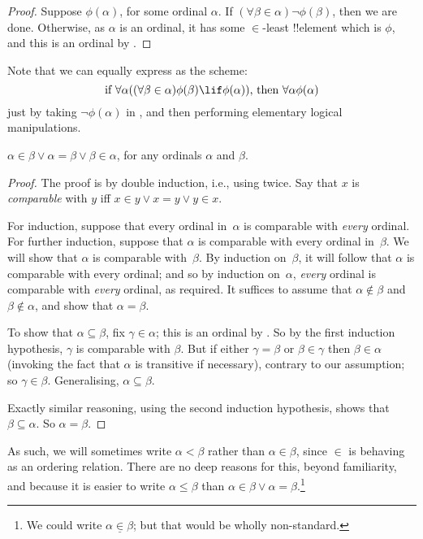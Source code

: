 \documentclass[../../../include/open-logic-section]{subfiles}
\begin{document}
\begin{proof}
Suppose $\phi(\alpha)$, for some ordinal $\alpha$. If $ (\forall \beta
\in \alpha) \lnot \phi(\beta)$, then we are done. Otherwise, as
$\alpha$ is an ordinal, it has some $\in$-least !!{element} which is
$\phi$, and this is an ordinal by .
\end{proof}
\noindent
Note that we can equally express  as the
scheme:
\[
\text{if }\forall \alpha((\forall \beta \in \alpha)\phi(\beta) \lif 
\phi(\alpha))\text{, then }\forall \alpha\phi(\alpha)
\]
just by taking $\lnot\phi(\alpha)$ in , and then performing elementary logical manipulations.

\begin{thm}[Trichotomy] 
$\alpha \in \beta \lor \alpha = \beta \lor \beta \in \alpha$, for any
ordinals $\alpha$ and $\beta$. 
\end{thm}

\begin{proof}
The proof is by double induction, i.e., using
 twice. Say that $x$ is \emph{comparable}
with $y$ iff $x \in y \lor x = y \lor y \in x$. 

For induction, suppose that every ordinal in~$\alpha$ is comparable
with \emph{every} ordinal. For further induction, suppose that
$\alpha$ is comparable with every ordinal in~$\beta$. We will show that
$\alpha$ is comparable with~$\beta$. By induction on~$\beta$, it will
follow that $\alpha$ is comparable with every ordinal; and so by
induction on~$\alpha$, \emph{every} ordinal is comparable with
\emph{every} ordinal, as required. It suffices to assume that $\alpha \notin \beta$ and $\beta \notin
\alpha$, and show that $\alpha = \beta$. 

To show that $\alpha \subseteq \beta$, fix $\gamma \in \alpha$; this
is an ordinal by . So by the first induction
hypothesis, $\gamma$ is comparable with $\beta$. But if either $\gamma
= \beta$ or $\beta \in \gamma$ then $\beta \in \alpha$ (invoking the
fact that $\alpha$ is transitive if necessary), contrary to our
assumption; so $\gamma \in \beta$. Generalising, $\alpha \subseteq
\beta$.

Exactly similar reasoning, using the second induction hypothesis,
shows that $\beta \subseteq \alpha$. So $\alpha = \beta$.
\end{proof}\noindent As such, we will sometimes write $\alpha <\beta$
rather than $\alpha \in \beta$, since $\in$ is behaving as an ordering
relation. There are no deep reasons for this, beyond familiarity, and
because it is easier to write $\alpha \leq \beta$ than $\alpha \in
\beta \lor \alpha = \beta$.\footnote{We could write $\alpha
\mathrel{\underline{\in}} \beta$; but that would be wholly
non-standard.}
\end{document}
